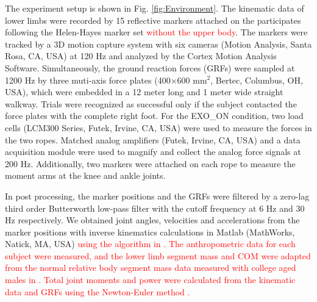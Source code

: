 \documentclass[twocolumn,cleanfoot,10pt]{asme2ej}
\begin{document}
The experiment setup is shown in Fig. \ref{fig:Environment}.
The kinematic data of lower limbs were recorded by 15 reflective markers attached on the participates following the Helen-Hayes marker set \cite{RN24} \textcolor{red}{without the upper body}.
The markers were tracked by a 3D motion capture system with six cameras (Motion Analysis, Santa Rosa, CA, USA) at 120 Hz and analyzed by the Cortex Motion Analysis Software.
Simultaneously, the ground reaction forces (GRFs) were sampled at 1200 Hz by three muti-axis force plates (400$\times$600 mm$^{2}$, Bertec, Columbus, OH, USA), which were embedded in a 12 meter long and 1 meter wide straight walkway.
Trials were recognized as successful only if the subject contacted the force plates with the complete right foot.
For the EXO\_ON condition, two load cells (LCM300 Series, Futek, Irvine, CA, USA) were used to measure the forces in the two ropes.
Matched analog amplifiers (Futek, Irvine, CA, USA) and a data acquisition module were used to magnify and collect the analog force signals at 200 Hz.
Additionally, two markers were attached on each rope to measure the moment arms at the knee and ankle joints.

In post processing, the marker positions and the GRFs were filtered by a zero-lag third order Butterworth low-pass filter with the cutoff frequency at 6 Hz and 30 Hz respectively.
We obtained joint angles, velocities and accelerations from the marker positions with inverse kinematics calculations in Matlab (MathWorks, Natick, MA, USA) \textcolor{red}{using the algorithm in \cite{RN24}.
The anthropometric data for each subject were measured, and the lower limb segment mass and COM were adapted from the normal relative body segment mass data measured with college aged males in \cite{de1996adjustments}.
Total joint moments and power were calculated from the kinematic data and GRFs using the Newton-Euler method \cite{kane1985dynamics}.}
\end{document}
